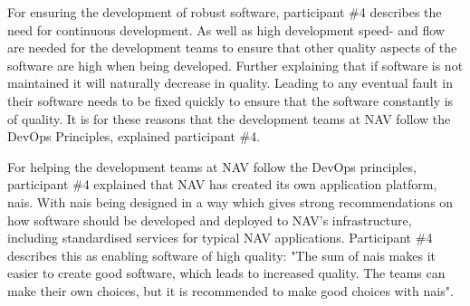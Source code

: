 
For ensuring the development of robust software, participant \#4 describes the need for continuous development. As well as high development speed- and flow are needed for the development teams to ensure that other quality aspects of the software are high when being developed. Further explaining that if software is not maintained it will naturally decrease in quality. Leading to any eventual fault in their software needs to be fixed quickly to ensure that the software constantly is of quality. It is for these reasons that the development teams at NAV follow the DevOps Principles, explained participant \#4.


For helping the development teams at NAV follow the DevOps principles, participant \#4 explained that NAV has created its own application platform, \gls{nais}. With \gls{nais} being designed in a way which gives strong recommendations on how software should be developed and deployed to NAV's infrastructure, including standardised services for typical NAV applications. Participant \#4 describes this as enabling software of high quality: "The sum of \gls{nais} makes it easier to create good software, which leads to increased quality. The teams can make their own choices, but it is recommended to make good choices with \gls{nais}".

